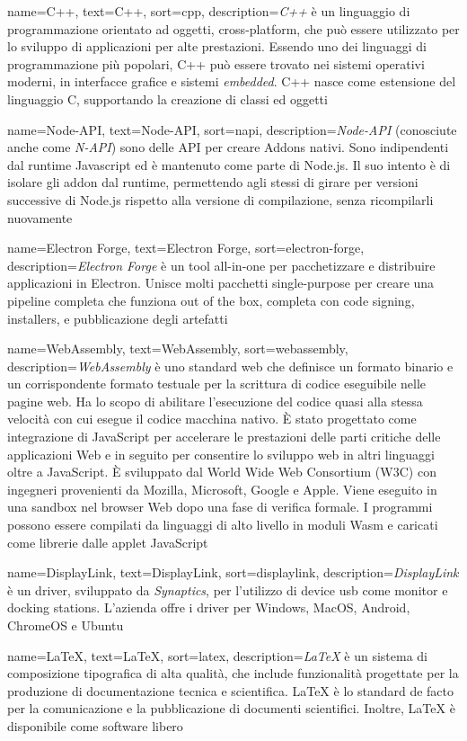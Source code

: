  {
    name=C++,
    text=C++,
    sort=cpp,
    description={\emph{C++} è un linguaggio di programmazione orientato ad oggetti, cross-platform, che può essere utilizzato per lo sviluppo di applicazioni per alte prestazioni.
    Essendo uno dei linguaggi di programmazione più popolari, C++ può essere trovato nei sistemi operativi moderni, in interfacce grafice e sistemi \emph{embedded}.
    C++ nasce come estensione del linguaggio C, supportando la creazione di classi ed oggetti}
}

 {
    name=Node-API,
    text=Node-API,
    sort=napi,
    description={\emph{Node-API} (conosciute anche come \emph{N-API}) sono delle API per creare Addons nativi. Sono indipendenti dal runtime Javascript ed è mantenuto come parte di Node.js. Il suo intento è di isolare gli addon dal runtime, permettendo agli stessi di girare per versioni successive di Node.js rispetto alla versione di compilazione, senza ricompilarli nuovamente}
}

 {
    name=Electron Forge,
    text=Electron Forge,
    sort=electron-forge,
    description={\emph{Electron Forge} è un tool all-in-one per pacchetizzare e distribuire applicazioni in Electron. Unisce molti pacchetti single-purpose per creare una pipeline completa che funziona out of the box, completa con code signing, installers, e pubblicazione degli artefatti}
}

 {
    name=WebAssembly,
    text=WebAssembly,
    sort=webassembly,
    description={\emph{WebAssembly} è uno standard web che definisce un formato binario e un corrispondente formato testuale per la scrittura di codice eseguibile nelle pagine web. Ha lo scopo di abilitare l'esecuzione del codice quasi alla stessa velocità con cui esegue il codice macchina nativo. È stato progettato come integrazione di JavaScript per accelerare le prestazioni delle parti critiche delle applicazioni Web e in seguito per consentire lo sviluppo web in altri linguaggi oltre a JavaScript. È sviluppato dal World Wide Web Consortium (W3C) con ingegneri provenienti da Mozilla, Microsoft, Google e Apple. Viene eseguito in una sandbox nel browser Web dopo una fase di verifica formale. I programmi possono essere compilati da linguaggi di alto livello in moduli Wasm e caricati come librerie dalle applet JavaScript}
}

 {
    name=DisplayLink,
    text=DisplayLink,
    sort=displaylink,
    description={\emph{DisplayLink} è un driver, sviluppato da \emph{Synaptics}, per l'utilizzo di device usb come monitor e docking stations. L'azienda offre i driver per Windows, MacOS, Android, ChromeOS e Ubuntu}
}

 {
    name=LaTeX,
    text=LaTeX,
    sort=latex,
    description={\emph{LaTeX} è un sistema di composizione tipografica di alta qualità, che include funzionalità progettate per la produzione di documentazione tecnica e scientifica. LaTeX è lo standard de facto per la comunicazione e la pubblicazione di documenti scientifici. Inoltre, LaTeX è disponibile come software libero}
}